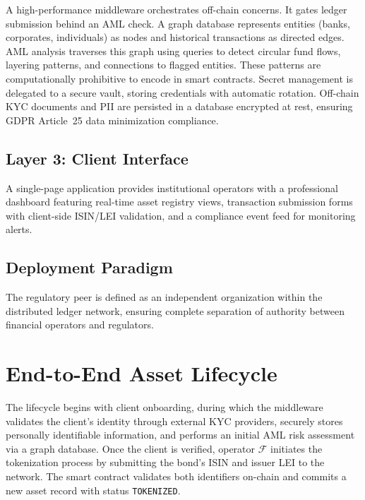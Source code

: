 \documentclass[journal,10pt,twocolumn]{IEEEtran}
\begin{document}
A high-performance middleware orchestrates off-chain concerns. It gates ledger submission behind an AML check. A graph database represents entities (banks, corporates, individuals) as nodes and historical transactions as directed edges. AML analysis traverses this graph using queries to detect circular fund flows, layering patterns, and connections to flagged entities. These patterns are computationally prohibitive to encode in smart contracts. Secret management is delegated to a secure vault, storing credentials with automatic rotation. Off-chain KYC documents and PII are persisted in a database encrypted at rest, ensuring GDPR Article~25 data minimization compliance.

\subsection{Layer 3: Client Interface}

A single-page application provides institutional operators with a professional dashboard featuring real-time asset registry views, transaction submission forms with client-side ISIN/LEI validation, and a compliance event feed for monitoring alerts.

\subsection{Deployment Paradigm}

The regulatory peer is defined as an independent organization within the distributed ledger network, ensuring complete separation of authority between financial operators and regulators.

\section{End-to-End Asset Lifecycle}
\label{sec:usecase}

The lifecycle begins with client onboarding, during which the middleware validates the client's identity through external KYC providers, securely stores personally identifiable information, and performs an initial AML risk assessment via a graph database. Once the client is verified, operator $\mathcal{F}$ initiates the tokenization process by submitting the bond's ISIN and issuer LEI to the network. The smart contract validates both identifiers on-chain and commits a new asset record with status \texttt{TOKENIZED}.
\end{document}
